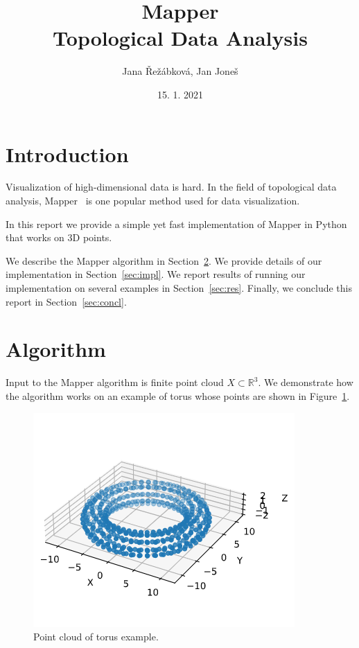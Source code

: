 \documentclass{article}
\title{Mapper \\ \vspace{0.2cm} \large Topological Data Analysis}
\author{Jana Řežábková, Jan Joneš}
\date{15. 1. 2021}
\begin{document}
\maketitle

\section{Introduction}

Visualization of high-dimensional data is hard.
In the field of topological data analysis, Mapper~\cite{mapper} is one popular method used for data visualization.

In this report we provide a simple yet fast implementation of Mapper in Python that works on 3D points.

We describe the Mapper algorithm in Section~\ref{sec:alg}.
We provide details of our implementation in Section~\ref{sec:impl}.
We report results of running our implementation on several examples in Section~\ref{sec:res}.
Finally, we conclude this report in Section~\ref{sec:concl}.

\section{Algorithm}\label{sec:alg}

Input to the Mapper algorithm is finite point cloud $X \subset \mathbb{R}^3$.
We demonstrate how the algorithm works on an example of torus whose points are shown in Figure~\ref{fig:torus-points}.

\begin{figure}[ht]
    \centering
    \includegraphics[width=0.7\columnwidth]{torus-point-cloud}
    \caption{Point cloud of torus example.}
    \label{fig:torus-points}
\end{figure}
\end{document}
